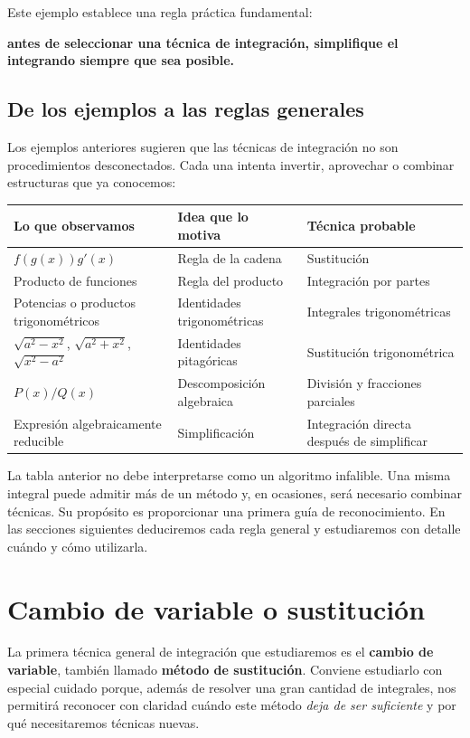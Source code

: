 \documentclass[12pt]{article}
\theoremstyle{definition}
\theoremstyle{remark}
\begin{document}
Este ejemplo establece una regla práctica fundamental:
\begin{center}
\textbf{antes de seleccionar una técnica de integración, simplifique el integrando siempre que sea posible.}
\end{center}

\subsection*{De los ejemplos a las reglas generales}
Los ejemplos anteriores sugieren que las técnicas de integración no son procedimientos desconectados. Cada una intenta invertir, aprovechar o combinar estructuras que ya conocemos:

\begin{center}
\begin{tabular}{p{}p{}p{}}
\toprule
\textbf{Lo que observamos} & \textbf{Idea que lo motiva} & \textbf{Técnica probable}\\
\midrule
$f(g(x))g'(x)$ & Regla de la cadena & Sustitución\\
Producto de funciones & Regla del producto & Integración por partes\\
Potencias o productos trigonométricos & Identidades trigonométricas & Integrales trigonométricas\\
$\sqrt{a^2-x^2}$, $\sqrt{a^2+x^2}$, $\sqrt{x^2-a^2}$ & Identidades pitagóricas & Sustitución trigonométrica\\
$P(x)/Q(x)$ & Descomposición algebraica & División y fracciones parciales\\
Expresión algebraicamente reducible & Simplificación & Integración directa después de simplificar\\
\bottomrule
\end{tabular}
\end{center}

La tabla anterior no debe interpretarse como un algoritmo infalible. Una misma integral puede admitir más de un método y, en ocasiones, será necesario combinar técnicas. Su propósito es proporcionar una primera guía de reconocimiento. En las secciones siguientes deduciremos cada regla general y estudiaremos con detalle cuándo y cómo utilizarla.

\section{Cambio de variable o sustitución}

La primera técnica general de integración que estudiaremos es el \textbf{cambio de variable}, también llamado \textbf{método de sustitución}. Conviene estudiarlo con especial cuidado porque, además de resolver una gran cantidad de integrales, nos permitirá reconocer con claridad cuándo este método \emph{deja de ser suficiente} y por qué necesitaremos técnicas nuevas.
\end{document}
